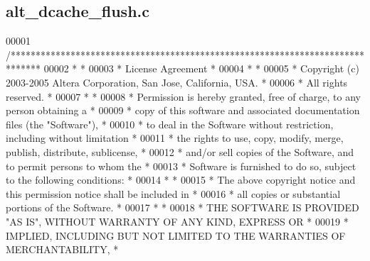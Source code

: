 \subsection{alt\+\_\+dcache\+\_\+flush.\+c}
\label{alt__dcache__flush_8c_source}

\begin{DoxyCode}
00001 \textcolor{comment}{/******************************************************************************}
00002 \textcolor{comment}{*                                                                             *}
00003 \textcolor{comment}{* License Agreement                                                           *}
00004 \textcolor{comment}{*                                                                             *}
00005 \textcolor{comment}{* Copyright (c) 2003-2005 Altera Corporation, San Jose, California, USA.      *}
00006 \textcolor{comment}{* All rights reserved.                                                        *}
00007 \textcolor{comment}{*                                                                             *}
00008 \textcolor{comment}{* Permission is hereby granted, free of charge, to any person obtaining a     *}
00009 \textcolor{comment}{* copy of this software and associated documentation files (the "Software"),  *}
00010 \textcolor{comment}{* to deal in the Software without restriction, including without limitation   *}
00011 \textcolor{comment}{* the rights to use, copy, modify, merge, publish, distribute, sublicense,    *}
00012 \textcolor{comment}{* and/or sell copies of the Software, and to permit persons to whom the       *}
00013 \textcolor{comment}{* Software is furnished to do so, subject to the following conditions:        *}
00014 \textcolor{comment}{*                                                                             *}
00015 \textcolor{comment}{* The above copyright notice and this permission notice shall be included in  *}
00016 \textcolor{comment}{* all copies or substantial portions of the Software.                         *}
00017 \textcolor{comment}{*                                                                             *}
00018 \textcolor{comment}{* THE SOFTWARE IS PROVIDED "AS IS", WITHOUT WARRANTY OF ANY KIND, EXPRESS OR  *}
00019 \textcolor{comment}{* IMPLIED, INCLUDING BUT NOT LIMITED TO THE WARRANTIES OF MERCHANTABILITY,    *}

\end{DoxyCode}
